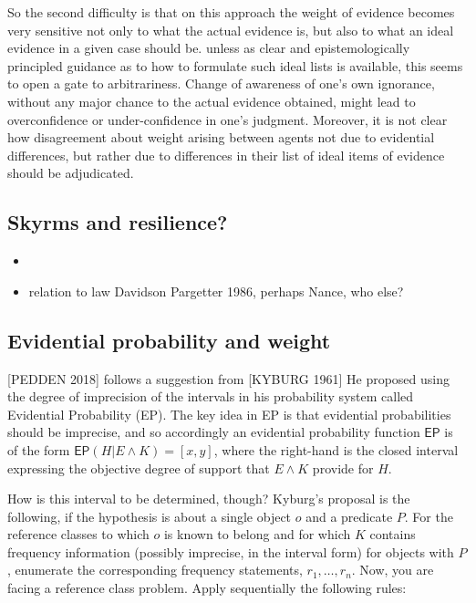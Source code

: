 \documentclass[
  10pt,
  dvipsnames,enabledeprecatedfontcommands]{scrartcl}
\providecommand{\tightlist}{%
  \setlength{\itemsep}{0pt}\setlength{\parskip}{0pt}}
\begin{document}
So the second difficulty is that on this approach the weight of evidence
becomes very sensitive not only to what the actual evidence is, but also
to what an ideal evidence in a given case should be. unless as clear and
epistemologically principled guidance as to how to formulate such ideal
lists is available, this seems to open a gate to arbitrariness. Change
of awareness of one's own ignorance, without any major chance to the
actual evidence obtained, might lead to overconfidence or
under-confidence in one's judgment. Moreover, it is not clear how
disagreement about weight arising between agents not due to evidential
differences, but rather due to differences in their list of ideal items
of evidence should be adjudicated.

\hypertarget{skyrms-and-resilience}{%
\subsection{Skyrms and resilience?}\label{skyrms-and-resilience}}

\begin{itemize}
\tightlist
\item
\item
  relation to law Davidson Pargetter 1986, perhaps Nance, who else?
\end{itemize}

\hypertarget{evidential-probability-and-weight}{%
\subsection{Evidential probability and
weight}\label{evidential-probability-and-weight}}

{[}PEDDEN 2018{]}  follows a suggestion from {[}KYBURG
1961{]} He proposed using the degree of imprecision of the
intervals in his probability system called Evidential Probability (EP).
The key idea in EP is that evidential probabilities should be imprecise,
and so accordingly an evidential probability function \(\mathsf{EP}\) is
of the form \(\mathsf{EP}(H \vert E \wedge K) = [x,y]\), where the
right-hand is the closed interval expressing the objective degree of
support that \(E\wedge K\) provide for \(H\).

How is this interval to be determined, though? Kyburg's proposal is the
following, if the hypothesis is about a single object \(o\) and a
predicate \(P\). For the reference classes to which \(o\) is known to
belong and for which \(K\) contains frequency information (possibly
imprecise, in the interval form) for objects with \(P\), enumerate the
corresponding frequency statements, \(r_1, \dots, r_n\). Now, you are
facing a reference class problem. Apply sequentially the following
rules:
\end{document}
